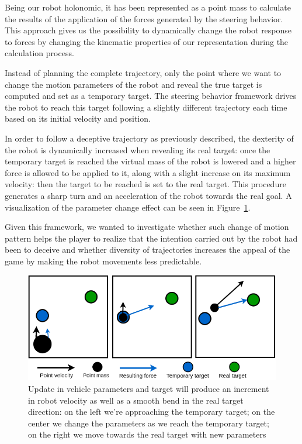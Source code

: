 Being our robot holonomic, it has been represented as a point mass to calculate the results of the application of the forces generated by the steering behavior. This approach gives us the possibility to dynamically change the robot response to forces by changing the kinematic properties of our representation during the calculation process.

Instead of planning the complete trajectory, only the point where we want to change the motion parameters of the robot and reveal the true target is computed and set as a temporary target. The steering behavior framework drives the robot to reach this target following a slightly different trajectory each time based on its initial velocity and position.

In order to follow a deceptive trajectory as previously described, the dexterity of the robot is dynamically increased when revealing its real target: once the temporary target is reached the virtual mass of the robot is lowered and a higher force is allowed to be applied to it, along with a slight increase on its maximum velocity: then the target to be reached is set to the real target. This procedure generates a sharp turn and an acceleration of the robot towards the real goal. A visualization of the parameter change effect can be seen in Figure~\ref{fig::trajectorySteering}. 

Given this framework, we wanted to investigate whether such change of motion pattern helps the player to realize that the intention carried out by the robot had been to deceive and whether diversity of trajectories increases the appeal of the game by making the robot movements less predictable.

\begin{figure}[htbp]
\centering
\includegraphics[scale=0.33]{images/06-deception/parameterUpdate}
\caption{Update in vehicle parameters and target will produce an increment in robot velocity as well as a smooth bend in the real target direction: on the left we're approaching the temporary target; on the center we change the parameters as we reach the temporary target; on the right we move towards the real target with new parameters}
\label{fig::trajectorySteering}
\end{figure}

